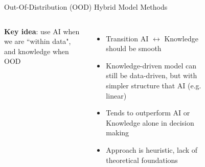 \documentclass[lecture]{beamer}
\begin{document}
\begin{frame}{\normalsize Out-Of-Distribution (OOD) Hybrid Model Methods}
\footnotesize



\begin{columns}
\begin{center}
\textbf{Key idea}: use AI when we are ``within data", and knowledge when OOD
\end{center}
\begin{itemize}
\item Transition AI $\leftrightarrow$ Knowledge should be smooth
\item Knowledge-driven model can still be data-driven, but with simpler structure that AI (e.g. linear)
\item Tends to outperform AI or Knowledge alone in decision making
\item Approach is heuristic, lack of theoretical foundations
\end{itemize}
  \begin{overlayarea}{\textwidth}{0.5\textheight}
    \begin{figure}
     \newcommand{\FS}{0.9}
        

\end{figure}
\end{overlayarea}
\end{columns}
\end{frame}
\end{document}
